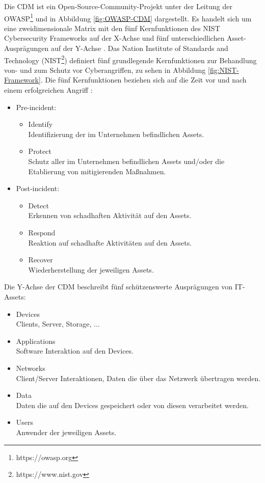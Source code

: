 Die CDM ist ein Open-Source-Community-Projekt unter der Leitung der OWASP\footnote{https://owasp.org} und in Abbildung \ref{fig:OWASP-CDM} dargestellt. Es handelt sich um eine zweidimensionale Matrix mit den fünf Kernfunktionen des \glqq{}NIST Cybersecurity Frameworks\grqq{} auf der X-Achse und fünf unterschiedlichen Asset-Ausprägungen auf der Y-Achse \autocite{NIST_Cybersec_Framework}. 
Das \glqq{}Nation Institute of Standards and Technology\grqq{} (NIST\footnote{https://www.nist.gov}) definiert fünf grundlegende Kernfunktionen zur Behandlung von- und zum Schutz vor Cyberangriffen, zu sehen in Abbildung \ref{fig:NIST-Framework}. 
\bigbreak
Die fünf Kernfunktionen beziehen sich auf die Zeit vor und nach einem erfolgreichen Angriff \autocite{NIST}:
\begin{itemize}
    \item Pre-incident:
    \begin{itemize}
        \item Identify\\
        Identifizierung der im Unternehmen befindlichen Assets.
        \item Protect\\
        Schutz aller im Unternehmen befindlichen Assets und/oder die Etablierung von mitigierenden Maßnahmen.
    \end{itemize}
    \item Post-incident:
    \begin{itemize}
        \item Detect\\
        Erkennen von schadhaften Aktivität auf den Assets.
        \item Respond\\
        Reaktion auf schadhafte Aktivitäten auf den Assets.
        \item Recover\\
        Wiederherstellung der jeweiligen Assets.
    \end{itemize}
\end{itemize}
\bigbreak
Die Y-Achse der CDM beschreibt fünf schützenswerte Ausprägungen von IT-Assets:
\begin{itemize}
    \item Devices\\
    Clients, Server, Storage, ...
    \item Applications\\
    Software Interaktion auf den Devices.
    \item Networks\\
    Client/Server Interaktionen, Daten die über das Netzwerk übertragen werden.
    \item Data\\
    Daten die auf den Devices gespeichert oder von diesen verarbeitet werden.
    \item Users\\
    Anwender der jeweiligen Assets.
\end{itemize}
